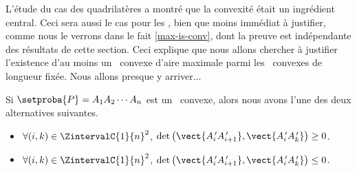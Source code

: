 L'étude du cas des quadrilatères a montré que la convexité était un ingrédient central. Ceci sera aussi le cas pour les \ngones, bien que moins immédiat à justifier, comme nous le verrons dans le fait \ref{max-is-conv}, dont la preuve est indépendante des résultats de cette section.
%
Ceci explique que nous allons chercher à justifier l'existence d'au moins un \ngone\ convexe d'aire maximale parmi les \ngones\ convexes de longueur fixée. Nous allons presque y arriver...




\begin{fact} \label{conv-pos-det}
    Si $\setproba{P} = A_1 A_2 \cdots A_n$ est un \ngone\ convexe, alors nous avons l'une des deux alternatives suivantes.
	\begin{itemize}
		\item $\forall (i, k) \in \ZintervalC{1}{n}^2$,
		$\det \big( \vect{A^{\,\prime}_i A^{\,\prime}_{i+1}}, \vect{A^{\,\prime}_i A^{\,\prime}_k} \big) \geq 0$.

		\item $\forall (i, k) \in \ZintervalC{1}{n}^2$,
		$\det \big( \vect{A^{\,\prime}_i A^{\,\prime}_{i+1}}, \vect{A^{\,\prime}_i A^{\,\prime}_k} \big) \leq 0$.
    \end{itemize}
\end{fact}


